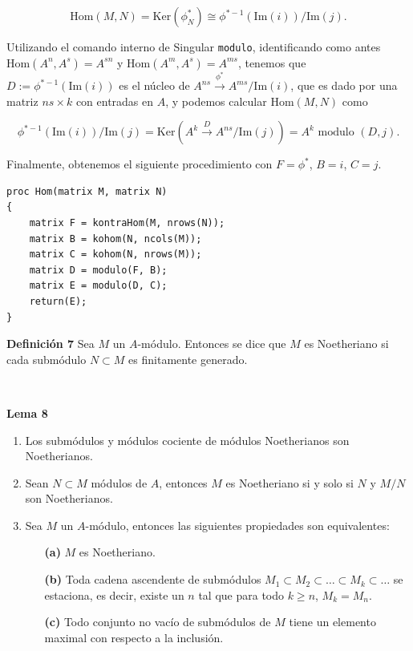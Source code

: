 \documentclass[10pt,a4paper]{article}
\begin{document}
\begin{enumerate}[label=(\alph*)]
\[
\text{Hom}(M, N) = \text{Ker}(\phi^*_N) \cong \phi^{*-1}(\text{Im}(i)) / \text{Im}(j).
\]

Utilizando el comando interno de Singular \texttt{modulo}, identificando como antes \(\text{Hom}(A^n, A^s) = A^{sn}\) y \(\text{Hom}(A^m, A^s) = A^{ms}\), tenemos que \(D := \phi^{*-1}(\text{Im}(i))\) es el núcleo de \(A^{ns} \overset{\phi^*}{\longrightarrow} A^{ms}/ \text{Im}(i)\), que es dado por una matriz \(ns \times k\) con entradas en \(A\), y podemos calcular \(\text{Hom}(M, N)\) como

\[
\phi^{*-1}(\text{Im}(i)) / \text{Im}(j) = \text{Ker}(A^k \overset{D}{\longrightarrow} A^{ns}/ \text{Im}(j)) = A^k \text{ modulo } (D, j).
\]

Finalmente, obtenemos el siguiente procedimiento con \(F = \phi^*\), \(B = i\), \(C = j\).

\begin{verbatim}
proc Hom(matrix M, matrix N)
{
    matrix F = kontraHom(M, nrows(N));
    matrix B = kohom(N, ncols(M));
    matrix C = kohom(N, nrows(M));
    matrix D = modulo(F, B);
    matrix E = modulo(D, C);
    return(E);
}
\end{verbatim}

\textbf{Definición 7} Sea \( M \) un \( A \)-módulo. Entonces se dice que \( M \) es Noetheriano si cada submódulo \( N \subset M \) es finitamente generado. 

\

\textbf{Lema 8}
\begin{enumerate}
    \item Los submódulos y módulos cociente de módulos Noetherianos son Noetherianos.
    \item Sean \( N \subset M \) módulos de \( A \), entonces \( M \) es Noetheriano si y solo si \( N \) y \( M/N \) son Noetherianos.
    \item Sea \( M \) un \( A \)-módulo, entonces las siguientes propiedades son equivalentes:
    \begin{enumerate}
        \item[\textbf{(a)}] \( M \) es Noetheriano.
        \item[\textbf{(b)}] Toda cadena ascendente de submódulos \( M_1 \subset M_2 \subset \ldots \subset M_k \subset \ldots \) se estaciona, es decir, existe un \( n \) tal que para todo \( k \geq n \), \( M_k = M_n \).
        \item[\textbf{(c)}] Todo conjunto no vacío de submódulos de \( M \) tiene un elemento maximal con respecto a la inclusión.
    \end{enumerate}
\end{enumerate}


\end{enumerate}
\end{document}
